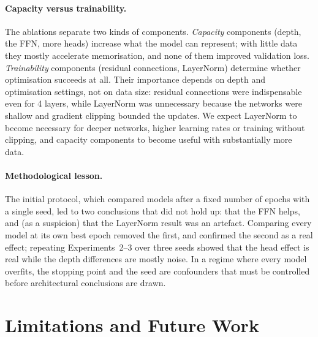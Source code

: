 \documentclass[11pt,a4paper]{article}
\begin{document}
\paragraph{Capacity versus trainability.} The ablations separate two kinds of components. \emph{Capacity} components (depth, the FFN, more heads) increase what the model can represent; with little data they mostly accelerate memorisation, and none of them improved validation loss. \emph{Trainability} components (residual connections, LayerNorm) determine whether optimisation succeeds at all. Their importance depends on depth and optimisation settings, not on data size: residual connections were indispensable even for 4 layers, while LayerNorm was unnecessary because the networks were shallow and gradient clipping bounded the updates. We expect LayerNorm to become necessary for deeper networks, higher learning rates or training without clipping, and capacity components to become useful with substantially more data.

\paragraph{Methodological lesson.} The initial protocol, which compared models after a fixed number of epochs with a single seed, led to two conclusions that did not hold up: that the FFN helps, and (as a suspicion) that the LayerNorm result was an artefact. Comparing every model at its own best epoch removed the first, and confirmed the second as a real effect; repeating Experiments~2--3 over three seeds showed that the head effect is real while the depth differences are mostly noise. In a regime where every model overfits, the stopping point and the seed are confounders that must be controlled before architectural conclusions are drawn.

\section{Limitations and Future Work}\label{sec:limitations}
\end{document}
